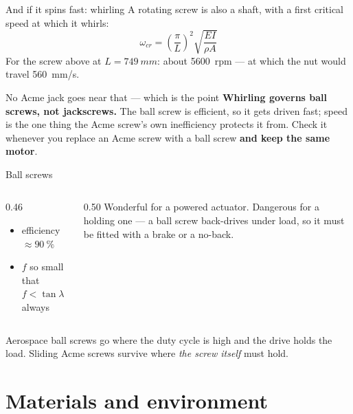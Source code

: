 \documentclass[aspectratio=169,10pt]{beamer}
\begin{document}
\begin{frame}{And if it spins fast: whirling}
A rotating screw is also a shaft, with a first critical speed at which it whirls:
\[
\omega_{cr}=\left(\frac{\pi}{L}\right)^{2}\sqrt{\frac{EI}{\rho A}}
\]
\vfill
For the screw above at $L=\SI{749}{mm}$: about \alert{\SI{5600}{rpm}} --- at which the nut would
travel \SI{560}{mm/s}.
\vfill
\begin{alertblock}{No Acme jack goes near that --- which is the point}
\textbf{Whirling governs ball screws, not jackscrews.} The ball screw is efficient, so it gets
driven fast; speed is the one thing the Acme screw's own inefficiency protects it from.
\vspace{2pt}
Check it whenever you replace an Acme screw with a ball screw \textbf{and keep the same motor}.
\end{alertblock}
\end{frame}

\begin{frame}{Ball screws}
\centering
\resizebox{!}{3.6cm}{}
\vfill
\raggedright
\begin{columns}[T]
\begin{column}{0.46\textwidth}
\begin{itemize}\small
  \item efficiency $\approx \SI{90}{\percent}$
  \item $f$ so small that $f<\tan\lambda$ \alert{always}
\end{itemize}
\end{column}
\begin{column}{0.50\textwidth}
{\small Wonderful for a powered actuator. \alert{Dangerous for a holding one} --- a ball screw
back-drives under load, so it must be fitted with a brake or a no-back.}
\end{column}
\end{columns}
\vfill
{\small Aerospace ball screws go where the duty cycle is high and the drive holds the load. Sliding
Acme screws survive where \emph{the screw itself} must hold.}
\end{frame}


\section{Materials and environment}
\end{document}
